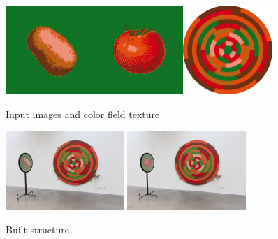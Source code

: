 \documentclass{article}
\begin{document}
\begin{figure}[ht!]
\centering
\includegraphics[width=0.3\textwidth]{images/potato-tomato/input_1.png}\includegraphics[width=0.3\textwidth]{images/potato-tomato/input_0.png}\includegraphics[width=0.3\textwidth]{images/potato-tomato/disc.png}
\caption{Input images and color field texture}
\end{figure}

\begin{figure}[ht!]
\centering
\includegraphics[width=0.4\textwidth]{images/results/potato_tomato_1.jpg}
\includegraphics[width=0.4\textwidth]{images/results/potato_tomato_2.jpg}
\caption{Built structure}
\end{figure}
\end{document}
